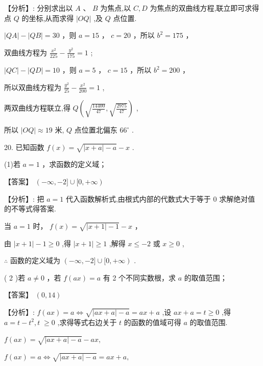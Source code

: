 \documentclass[10pt]{article}
\newcommand*\circled[1]{\tikz[baseline=(char.base)]{\node[shape=circle,draw,inner sep=1.5pt] (char) {\small #1};}}
\begin{document}
【分析】: 分别求出以 \(A\text{ 、 }B\) 为焦点,以 \(C,D\) 为焦点的双曲线方程,联立即可求得点 \(Q\) 的坐标,从而求得 \(\left| {OQ}\right|\) ,及 \(Q\) 点位置.

 \circled{1}  \(\left| {QA}\right|  - \left| {QB}\right|  = {30}\) ，则 \(a = {15}\) ， \(c = {20}\) ，所以 \({b}^{2} = {175}\) ，

双曲线方程为 \(\frac{{x}^{2}}{225} - \frac{{y}^{2}}{175} = 1\) ;

 \circled{2}  \(\left| {QC}\right|  - \left| {QD}\right|  = {10}\) ，则 \(a = 5\) ， \(c = {15}\) ，所以 \({b}^{2} = {200}\) ，

所以双曲线方程为 \(\frac{{y}^{2}}{25} - \frac{{x}^{2}}{200} = 1\) ,

两双曲线方程联立,得 \(Q\left( {\sqrt{\frac{14400}{47}},\sqrt{\frac{2975}{47}}}\right)\) ,

所以 \(\left| {OQ}\right|  \approx  {19}\) 米, \(Q\) 点位置北偏东 \({66}^{ \circ  }\) .

20. 已知函数 \(f\left( x\right)  = \sqrt{\left| {x + a}\right|  - a} - x\) .

(1)若 \(a = 1\) ，求函数的定义域；

【答案】 \(\left( {-\infty , - 2\rbrack \cup \lbrack 0, + \infty }\right)\)

【分析】: 把 \(a = 1\) 代入函数解析式,由根式内部的代数式大于等于 0 求解绝对值的不等式得答案.

当 \(a = 1\) 时， \(f\left( x\right)  = \sqrt{\left| {x + 1}\right|  - 1} - x\) ，

由 \(\left| {x + 1}\right|  - 1 \geq  0\) ,得 \(\left| {x + 1}\right|  \geq  1\) ,解得 \(x \leq   - 2\) 或 \(x \geq  0\) ,

\(\therefore\) 函数的定义域为 \(\left( {-\infty , - 2\rbrack \cup \lbrack 0, + \infty }\right)\) .

( 2 )若 \(a \neq  0\) ，若 \(f\left( {ax}\right)  = a\) 有 2 个不同实数根，求 \(a\) 的取值范围；

【答案】 \(\left( {0,{14}}\right)\)

【分析】: \(f\left( {ax}\right)  = a \Leftrightarrow  \sqrt{\left| {{ax} + a}\right|  - a} = {ax} + a\) ,设 \({ax} + a = t \geq  0\) ,得 \(a = t - {t}^{2},t \; \geq  0\) ,求得等式右边关于 \(t\) 的函数的值域可得 \(a\) 的取值范围.

\(f\left( {ax}\right)  = \sqrt{\left| {{ax} + a}\right|  - a} - {ax},\)

\(f\left( {ax}\right)  = a \Leftrightarrow  \sqrt{\left| {{ax} + a}\right|  - a} = {ax} + a,\)
\end{document}

